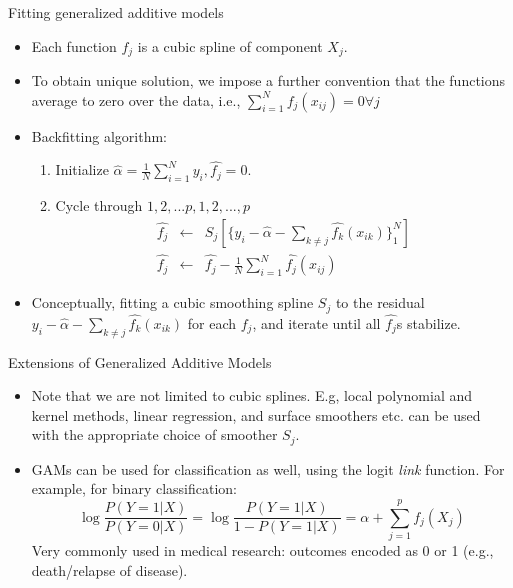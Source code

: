 \documentclass{beamer}
\begin{document}
\begin{frame}{Fitting generalized additive models}
    \begin{itemize}
        \item Each function $f_j$ is a cubic spline of component $X_j$.
        \item To obtain unique solution, we impose a further convention that the functions average to zero over the data, i.e., $\sum_{i=1}^N f_j(x_{ij}) = 0 \forall j$
        \item Backfitting algorithm:
        \begin{enumerate}
            \item Initialize $\hat{\alpha} = \frac{1}{N} \sum_{i=1}^N y_i, \hat{f_j} = 0$.
            \item Cycle through $1, 2, ... p, 1, 2, ..., p$
            \begin{eqnarray*}
                \hat{f_j} & \longleftarrow & S_j\left[ \{y_i - \hat{\alpha} - \sum_{k\neq j} \hat{f_k}(x_{ik})\}_1^N \right]\\
                \hat{f_j} &\longleftarrow & \hat{f_j} - \frac{1}{N} \sum_{i=1}^N \hat{f_j}(x_{ij})
            \end{eqnarray*}
        \end{enumerate}
        \item Conceptually, fitting a cubic smoothing spline $S_j$ to the residual $y_i - \hat{\alpha} - \sum_{k\neq j} \hat{f_k}(x_{ik})$ for each $f_j$, and iterate until all $\hat{f_j}$s stabilize.  
    \end{itemize}
\end{frame}


\begin{frame}{Extensions of Generalized Additive Models}
    \begin{itemize}
        \item Note that we are not limited to cubic splines. E.g, local polynomial and kernel methods, linear regression, and surface smoothers etc. can be used with the appropriate choice of smoother $S_j$.
        \item GAMs can be used for classification as well, using the logit \textit{link} function. For example, for binary classification:
        \begin{equation*}
            \log{\frac{P(Y=1|X)}{P(Y=0|X)}} = \log{\frac{P(Y=1|X)}{1-P(Y=1|X)}} =  \alpha + \sum_{j=1}^p f_j(X_j)
        \end{equation*}
        Very commonly used in medical research: outcomes encoded as 0 or 1 (e.g., death/relapse of disease).
    \end{itemize}
\end{frame}
\end{document}
